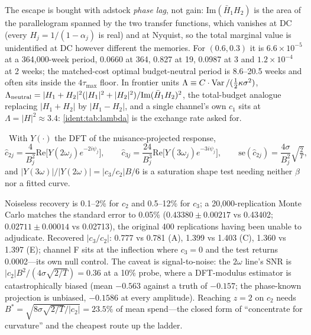 The escape is bought with adstock \emph{phase lag}, not gain: $\mathrm{Im}(\bar H_1H_2)$ is the area of the parallelogram spanned by the two transfer functions, which vanishes at DC (every $H_j = 1/(1-\alpha_j)$ is real) and at Nyquist, so the total marginal value is unidentified at DC however different the memories. For $(0.6, 0.3)$ it is $6.6\times10^{-5}$ at a 364,000-week period, 0.0660 at 364, 0.827 at 19, 0.0987 at 3 and $1.2\times10^{-4}$ at 2 weeks; the matched-cost optimal budget-neutral period is 8.6--20.5 weeks and often sits inside the $4\tau_{\max}$ floor. In frontier units $\Lambda \equiv C\cdot\operatorname{Var}/(\tfrac12\kappa\sigma^2)$, $\Lambda_{\rm neutral} = |H_1 + H_2|^2(|H_1|^2 + |H_2|^2)/\mathrm{Im}(\bar H_1H_2)^2$, the total-budget analogue replacing $|H_1 + H_2|$ by $|H_1 - H_2|$, and a single channel's own $c_1$ sits at $\Lambda = |H|^2 \approx 3.4$: \cref{ident:tab:lambda} is the exchange rate  asked for.

\begin{construction}
\label{ident:con:readout}
\tagEstablished\ With $Y(\cdot)$ the DFT of the nuisance-projected response,
\begin{equation}
\hat c_{2j} = \frac{4}{B_j^2}\mathrm{Re}\big[Y(2\omega_j)e^{-2i\psi_j}\big], \qquad \hat c_{3j} = \frac{24}{B_j^3}\mathrm{Re}\big[Y(3\omega_j)e^{-3i\psi_j}\big], \qquad \mathrm{se}(\hat c_{2j}) = \frac{4\sigma}{B_j^2}\sqrt{\tfrac{2}{T}},
\label{ident:eq:readout}
\end{equation}
and $|Y(3\omega)|/|Y(2\omega)| = |c_3/c_2|B/6$ is a saturation shape test needing neither $\beta$ nor a fitted curve.
\end{construction}

Noiseless recovery is 0.1--2\% for $c_2$ and 0.5--12\% for $c_3$; a 20,000-replication Monte Carlo matches the standard error to 0.05\% ($0.43380 \pm 0.00217$ vs 0.43402; $0.02711 \pm 0.00014$ vs 0.02713), the original 400 replications having been unable to adjudicate. Recovered $|c_3/c_2|$: 0.777 vs 0.781 (A), 1.399 vs 1.403 (C), 1.360 vs 1.397 (E); channel F sits at the inflection where $c_3 = 0$ and the test returns 0.0002---its own null control. The caveat is signal-to-noise: the $2\omega$ line's SNR is $|c_2|B^2/(4\sigma\sqrt{2/T}) = 0.36$ at a 10\% probe, where a DFT-modulus estimator is catastrophically biased (mean $-0.563$ against a truth of $-0.157$; the phase-known projection is unbiased, $-0.1586$ at every amplitude). Reaching $z = 2$ on $c_2$ needs $B^* = \sqrt{8\sigma\sqrt{2/T}/|c_2|} = 23.5\%$ of mean spend---the closed form of ``concentrate for curvature'' and the cheapest route up the ladder.

